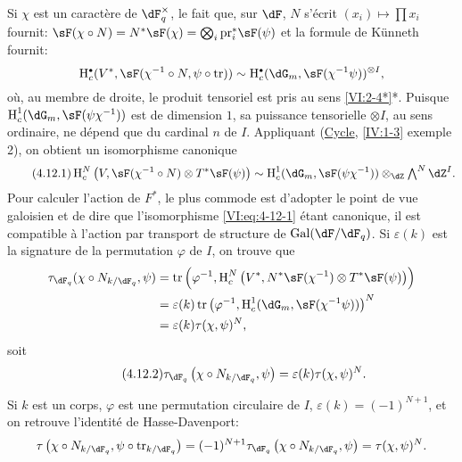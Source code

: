 Si $\chi$ est un caractère de $\dF_q^\times$, le fait que, sur $\dF$, $N$ 
s'écrit $(x_i)\mapsto \prod x_i$ fournit: 
$\sF(\chi\circ N)=N^\ast\sF(\chi) = \bigotimes_i \pr_i^\ast\sF(\psi)$ 
et la formule de K\"unneth fournit: 
\[
  \h_c^\bullet(V^\ast,\sF(\chi^{-1}\circ N,\psi\circ \tr)) \sim \h_c^\bullet(\dG_m,\sF(\chi^{-1}\psi))^{\otimes I} \text{,} 
\]
où, au membre de droite, le produit tensoriel est pris au sens 
\ref{VI:2-4*}*. Puisque $\h_c^1(\dG_m,\sF(\psi\chi^{-1}))$ est de dimension 
$1$, sa puissance tensorielle $\otimes I$, au sens ordinaire, ne dépend que 
du cardinal $n$ de $I$. Appliquant (\hyperlink{IV}{Cycle}, \ref{IV:1-3} exemple 
2), on obtient un isomorphisme canonique 
\begin{equation*}\tag{4.12.1}\label{VI:eq:4-12-1}
  \h_c^N\left(V,\sF(\chi^{-1}\circ N)\otimes T^\ast \sF(\psi)\right) \sim \h_c^1(\dG_m,\sF(\psi\chi^{-1})) \otimes_\dZ \textstyle \bigwedge^N \dZ^I \text{.}
\end{equation*}
Pour calculer l'action de $F^\ast$, le plus commode est d'adopter le point de 
vue galoisien et de dire que l'isomorphisme \eqref{VI:eq:4-12-1} étant 
canonique, il est compatible à l'action par transport de structure de 
$\gal(\dF/\dF_q)$. Si $\varepsilon(k)$ est la signature de la permutation 
$\varphi$ de $I$, on trouve que 
\begin{align*} 
  \tau_{\dF_q}(\chi\circ N_{k/\dF_q},\psi) 
    &= \tr\left(\varphi^{-1},\h_c^N\left(V^\ast,N^\ast\sF(\chi^{-1})\otimes T^\ast \sF(\psi)\right)\right) \\ 
    &= \varepsilon(k) \tr\left(\varphi^{-1},\h_c^1(\dG_m,\sF(\chi^{-1}\psi))\right)^N \\
    &= \varepsilon(k) \tau(\chi,\psi)^N \text{,} 
\end{align*}
soit 
\begin{equation*}\tag{4.12.2}\label{VI:eq:4-12-2}
  \tau_{\dF_q}\left(\chi\circ N_{k/\dF_q},\psi\right) = \varepsilon(k) \tau(\chi,\psi)^N \text{.} 
\end{equation*}

Si $k$ est un corps, $\varphi$ est une permutation circulaire de $I$, 
$\varepsilon(k) = (-1)^{N+1}$, et on retrouve l'identité de Hasse-Davenport: 
\[
  \tau\left(\chi\circ N_{k/\dF_q},\psi\circ \tr_{k/\dF_q}\right) = (-1)^{N+1} \tau_{\dF_q}\left(\chi\circ N_{k/\dF_q},\psi\right) = \tau(\chi,\psi)^N \text{.} 
\]





